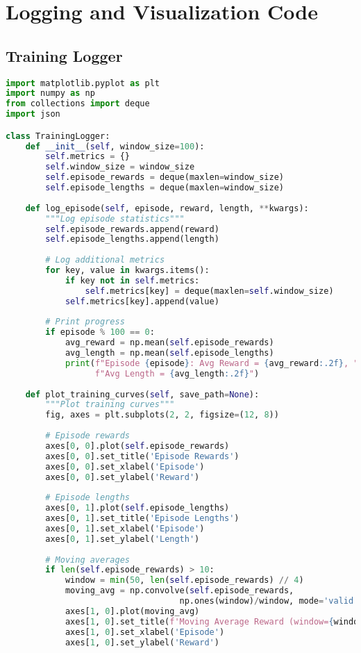 \section{Logging and Visualization Code}

\subsection{Training Logger}

\begin{lstlisting}[language=Python, caption=Training Logger]
import matplotlib.pyplot as plt
import numpy as np
from collections import deque
import json

class TrainingLogger:
    def __init__(self, window_size=100):
        self.metrics = {}
        self.window_size = window_size
        self.episode_rewards = deque(maxlen=window_size)
        self.episode_lengths = deque(maxlen=window_size)
    
    def log_episode(self, episode, reward, length, **kwargs):
        """Log episode statistics"""
        self.episode_rewards.append(reward)
        self.episode_lengths.append(length)
        
        # Log additional metrics
        for key, value in kwargs.items():
            if key not in self.metrics:
                self.metrics[key] = deque(maxlen=self.window_size)
            self.metrics[key].append(value)
        
        # Print progress
        if episode % 100 == 0:
            avg_reward = np.mean(self.episode_rewards)
            avg_length = np.mean(self.episode_lengths)
            print(f"Episode {episode}: Avg Reward = {avg_reward:.2f}, "
                  f"Avg Length = {avg_length:.2f}")
    
    def plot_training_curves(self, save_path=None):
        """Plot training curves"""
        fig, axes = plt.subplots(2, 2, figsize=(12, 8))
        
        # Episode rewards
        axes[0, 0].plot(self.episode_rewards)
        axes[0, 0].set_title('Episode Rewards')
        axes[0, 0].set_xlabel('Episode')
        axes[0, 0].set_ylabel('Reward')
        
        # Episode lengths
        axes[0, 1].plot(self.episode_lengths)
        axes[0, 1].set_title('Episode Lengths')
        axes[0, 1].set_xlabel('Episode')
        axes[0, 1].set_ylabel('Length')
        
        # Moving averages
        if len(self.episode_rewards) > 10:
            window = min(50, len(self.episode_rewards) // 4)
            moving_avg = np.convolve(self.episode_rewards, 
                                   np.ones(window)/window, mode='valid')
            axes[1, 0].plot(moving_avg)
            axes[1, 0].set_title(f'Moving Average Reward (window={window})')
            axes[1, 0].set_xlabel('Episode')
            axes[1, 0].set_ylabel('Reward')
        

\end{lstlisting}
